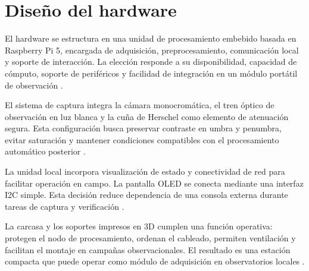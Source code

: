 \section{Diseño del hardware}

El hardware se estructura en una unidad de procesamiento embebido basada en Raspberry Pi 5, encargada de adquisición, preprocesamiento, comunicación local y soporte de interacción. La elección responde a su disponibilidad, capacidad de cómputo, soporte de periféricos y facilidad de integración en un módulo portátil de observación \citep{raspberryPi5Docs2026,nmcliHotspot2026}.


El sistema de captura integra la cámara monocromática, el tren óptico de observación en luz blanca y la cuña de Herschel como elemento de atenuación segura. Esta configuración busca preservar contraste en umbra y penumbra, evitar saturación y mantener condiciones compatibles con el procesamiento automático posterior \citep{zwoASI174Manual2025,luntWhiteLightWedges2026,baaderHerschelUsage2026}.

La unidad local incorpora visualización de estado y conectividad de red para facilitar operación en campo. La pantalla OLED se conecta mediante una interfaz I2C simple. Esta decisión reduce dependencia de una consola externa durante tareas de captura y verificación \citep{raspberryPi5Docs2026,nmcliHotspot2026}.

La carcasa y los soportes impresos en 3D cumplen una función operativa: protegen el nodo de procesamiento, ordenan el cableado, permiten ventilación y facilitan el montaje en campañas observacionales. El resultado es una estación compacta que puede operar como módulo de adquisición en observatorios locales \citep{raspberryPi5Docs2026,zwoASILinuxManual}.


